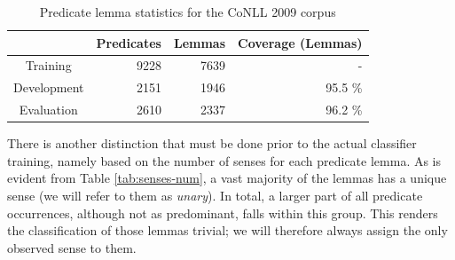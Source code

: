 \documentclass[12pt,notitlepage]{report}
\begin{document}
\begin{table}[htbp]
\caption{Predicate lemma statistics for the CoNLL 2009 corpus}\label{tab:lemma-stats}
\begin{center}
\begin{tabular}{|c|rrr|}\hline
& \bf Predicates  &\bf Lemmas & \bf Coverage (Lemmas) \\\hline
Training & 9228 & 7639 &  - \\
Development & 2151 & 1946 & 95.5 \% \\
Evaluation &  2610 & 2337 & 96.2 \%  \\\hline
\end{tabular}
\end{center}
\end{table}

There is another distinction that must be done prior to the actual classifier training, namely based on the number of senses for each predicate lemma. As is evident from Table \ref{tab:senses-num}, a vast majority of the lemmas has a unique sense (we will refer to them as \emph{unary}). In total, a larger part of all predicate occurrences, although not as predominant, falls within this group. This renders the classification of those lemmas trivial; we will therefore always assign the only observed sense to them.
\end{document}
